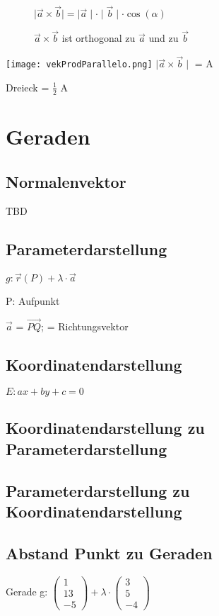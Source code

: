 \begin{multicols*}{3}
    \begin{wrapfigure}{r}{5.5cm}
        \vspace{-70pt}
        $ \mid \vec{a} \times \vec{b} \mid = \mid\vec{a}\mid \cdot \mid\vec{b}\mid \cdot \cos(\alpha) $

        {$\vec{a} \times \vec{b}$ ist orthogonal zu $\vec{a}$ und zu $\vec{b}$}
    \end{wrapfigure}

    \texttt{[image: vekProdParallelo.png]}
    { $\mid \vec{a} \times \vec{b} \mid $ = A }

    {Dreieck = $\frac{1}{2}$ A}

    \WhiteSpace


    \section{Geraden}
    \subsection{Normalenvektor}
    TBD

    \subsection{Parameterdarstellung}
    {\large $ g: \vec{r}(P) + \lambda \cdot \vec{a}  $}

    {P: Aufpunkt}

    {$ \vec{a}$ = $\overrightarrow{PQ} $;  = Richtungsvektor}


    \subsection{Koordinatendarstellung}
    {$E: ax + by + c= 0 $}
    \subsection{Koordinatendarstellung zu Parameterdarstellung }

    \subsection{Parameterdarstellung zu Koordinatendarstellung}

    \subsection{Abstand Punkt zu Geraden}
    { Gerade g: $ \begin{pmatrix}
                1  \\
                13 \\
                -5
            \end{pmatrix} + \lambda \cdot
            \begin{pmatrix}
                3 \\
                5 \\
                -4
            \end{pmatrix} $}


\end{multicols*}
